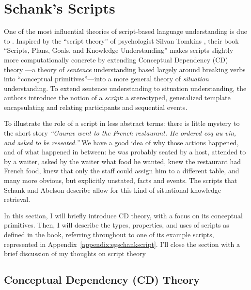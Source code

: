 \section{Schank's Scripts}
\label{sec:schank}


One of the most influential theories of script-based language understanding is due to \citet{schankandabelson}. Inspired by the ``script theory'' of psychologist Silvan Tomkins \citep{tomkins1978script}, their book ``Scripts, Plans, Goals, and Knowledge Understanding'' makes scripts slightly more computationally concrete by extending Conceptual Dependency (CD) theory \citep{schank1969conceptual}---a theory of \textit{sentence} understanding based largely around breaking verbs into ``conceptual primitives''---into a more general theory of \textit{situation} understanding. To extend sentence understanding to situation understanding, the authors introduce the notion of a \textit{script}: a stereotyped, generalized template encapsulating and relating participants and sequential events.

To illustrate the role of a script in less abstract terms: there is little mystery to the short story \textit{``Gaurav went to the French restaurant. He ordered coq au vin, and asked to be reseated.''} We have a good idea of why those actions happened, and of what happened in between: he was probably seated by a host, attended to by a waiter, asked by the waiter what food he wanted, knew the restaurant had French food, knew that only the staff could assign him to a different table, and many more obvious, but explicitly unstated, facts and events. The scripts that Schank and Abelson describe allow for this kind of situational knowledge retrieval.

In this section, I will briefly introduce CD theory, with a focus on its conceptual primitives. Then, I will describe the types, properties, and uses of scripts as defined in the book, referring throughout to one of its example scripts, represented in Appendix~\ref{appendix:egschankscript}. I'll close the section with a brief discussion of my thoughts on script theory

\iffalse
\subsection{Conceptual Dependency (CD) Theory}

